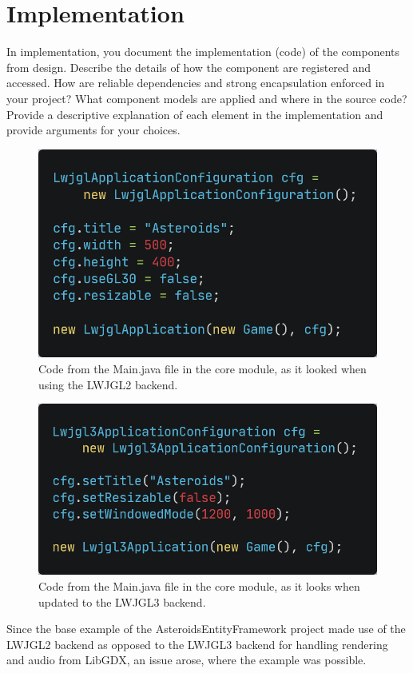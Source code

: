 \section{Implementation}
In implementation, you document the implementation (code) of the components from
design.
Describe the details of how the component are registered and accessed.
How are reliable dependencies and strong encapsulation enforced in your project?
What component models are applied and where in the source code?
Provide a descriptive explanation of each element in the implementation and 
provide arguments for your choices.
\\
\begin{figure}[H]
    \includegraphics[width=\textwidth]{images/code/lwjgl2backend.png}
    \caption{Code from the Main.java file in the core module, as it looked when using the LWJGL2 backend.}
\end{figure}
\begin{figure}
    \includegraphics[width=\textwidth]{images/code/lwjgl3backend.png}
    \caption{Code from the Main.java file in the core module, as it looks when updated to the LWJGL3 backend.}
    
\end{figure}

Since the base example of the AsteroidsEntityFramework project made use of the
LWJGL2 backend as opposed to the LWJGL3 backend for handling rendering and audio
from LibGDX, an issue arose, where the example was possible. 